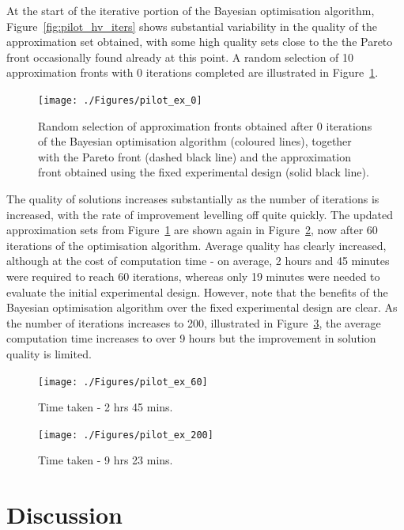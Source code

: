 \documentclass{article} %
\begin{document}
At the start of the iterative portion of the Bayesian optimisation algorithm, Figure~\ref{fig:pilot_hv_iters} shows substantial variability in the quality of the approximation set obtained, with some high quality sets close to the the Pareto front occasionally found already at this point. A random selection of 10 approximation fronts with 0 iterations completed are illustrated in Figure~\ref{fig:pilot_ex_0}.

\begin{figure}
\centering
\texttt{[image: ./Figures/pilot\_ex\_0]}
\caption{Random selection of approximation fronts obtained after 0 iterations of the Bayesian optimisation algorithm (coloured lines), together with the Pareto front (dashed black line) and the approximation front obtained using the fixed experimental design (solid black line).}
\label{fig:pilot_ex_0}
\end{figure}

The quality of solutions increases substantially as the number of iterations is increased, with the rate of improvement levelling off quite quickly. The updated approximation sets from Figure~\ref{fig:pilot_ex_0} are shown again in Figure~\ref{fig:pilot_ex_60}, now after 60 iterations of the optimisation algorithm. Average quality has clearly increased, although at the cost of computation time - on average, 2 hours and 45 minutes were required to reach 60 iterations, whereas only 19 minutes were needed to evaluate the initial experimental design. However, note that the benefits of the Bayesian optimisation algorithm over the fixed experimental design are clear. As the number of iterations increases to 200, illustrated in Figure~\ref{fig:pilot_ex_200}, the average computation time increases to over 9 hours but the improvement in solution quality is limited.

\begin{figure}
\centering
\texttt{[image: ./Figures/pilot\_ex\_60]}
\caption{Time taken - 2 hrs 45 mins.}
\label{fig:pilot_ex_60}
\end{figure}

\begin{figure}
\centering
\texttt{[image: ./Figures/pilot\_ex\_200]}
\caption{Time taken - 9 hrs 23 mins.}
\label{fig:pilot_ex_200}
\end{figure}



\section{Discussion}\label{sec:discussion}
\end{document}
